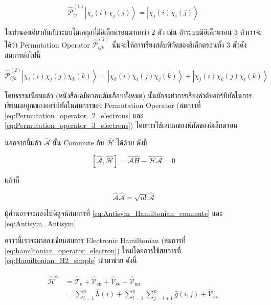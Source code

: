 \begin{equation}
    \label{eq:Permutation_operator_2_electrons}
    \hat{\mathscr{P}}_{i j}^{(1)}\left|\chi_i(i) \chi_j(j)\right\rangle
    =
    \left|\chi_j(i) \chi_i(j)\right\rangle
\end{equation}

ในทำนองเดียวกันกับระบบโมเลกุลที่มีอิเล็กตรอนมากกว่า 2 ตัว เช่น ถ้าระบบมีอิเล็กตรอน 3 ตัวเราจะได้ว่า Permutation Operator
$\hat{\mathcal{P}}_{i j k}^{(2)}$ นั้นจะให้การเรียงสลับพิกัดของอิเล็กตรอนทั้ง 3 ตัวดังสมการต่อไปนี้

\begin{equation}
    \label{eq:Permutation_operator_3_electrons}
    \hat{\mathscr{P}}_{i j k}^{(2)}\left|\chi_i(i) \chi_j(j) \chi_k(k)\right\rangle
    =
    \left|\chi_k(i) \chi_i(j) \chi_j(k)\right\rangle
    + \left|\chi_j(i) \chi_k(j) \chi_i(k)\right\rangle
\end{equation}

โดยธรรมเนียมแล้ว (หนังสือเคมีควอนตัมเกือบทั้งหมด) นั้นมักจะทำการเรียงลำดับออร์บิทัลในการเขียนผลคูณของออร์บิทัลในสมการของ Permutation
Operator (สมการที่ \eqref{eq:Permutation_operator_2_electrons} และ \eqref{eq:Permutation_operator_3_electrons})
โดยการใช้เลเบลของพิกัดของอิเล็กตรอน

นอกจากนี้แล้ว $\hat{\mathscr{A}}$ นั้น Commute กับ $\hat{\mathscr{H}}$ ได้ด้วย ดังนี้

\begin{equation}
    \label{eq:Antisym_Hamiltonian_commute}
    [\hat{\mathscr{A}}, \hat{\mathscr{H}}]
    = \hat{\mathscr{A}} \hat{H}-\hat{\mathscr{H}} \hat{\mathscr{A}}
    = 0
\end{equation}

\noindent แล้วก็

\begin{equation}
    \label{eq:Antisym_Antisym}
    \hat{\mathscr{A}} \hat{\mathscr{A}} = \sqrt{n !} \hat{\mathscr{A}}
\end{equation}

\noindent ผู้อ่านอาจจะลองไปพิสูจน์สมการที่ \eqref{eq:Antisym_Hamiltonian_commute} และ \eqref{eq:Antisym_Antisym}

คราวนี้เราจะมาลองเขียนสมการ Electronic Hamiltonian (สมการที่ \eqref{eq:hamiltonian_operator_electron})
ใหม่โดยการใช้สมการที่ \eqref{eq:Hamiltonian_H2_simple} เข้ามาช่วย ดังนี้

\begin{equation}
    \begin{aligned}
        \hat{\mathscr{H}}^{\text{el}}
         & = \hat{\mathscr{T}}_{\text{e}}
        + \hat{\mathscr{V}}_{\text{en}}
        + \hat{\mathscr{V}}_{\text{ee}}
        + \hat{\mathscr{V}}_{\text{nn}}   \\
         & = \sum_{i=1}^{n} \hat{h}(i)
        + \sum_{i=1}^{n} \sum_{j=i+1}^{n} \hat{g}(i,j) + \hat{\mathscr{V}}_{nn}
    \end{aligned}
\end{equation}

